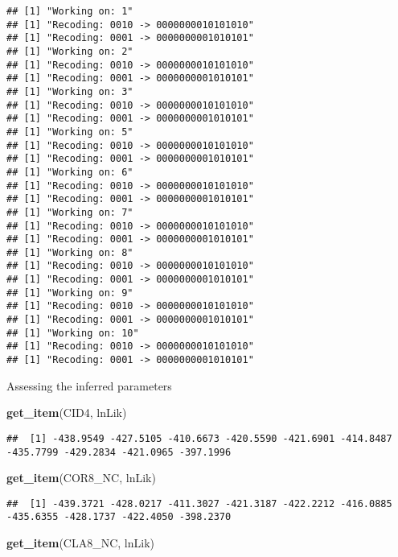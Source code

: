 \documentclass[
]{article}
\newenvironment{Shaded}{\begin{snugshade}}{\end{snugshade}}
\newcommand{\FunctionTok}[1]{\textcolor[rgb]{0.13,0.29,0.53}{\textbf{#1}}}
\newcommand{\NormalTok}[1]{#1}
\newcommand{\StringTok}[1]{\textcolor[rgb]{0.31,0.60,0.02}{#1}}
\begin{document}
\begin{verbatim}
## [1] "Working on: 1"
## [1] "Recoding: 0010 -> 0000000010101010"
## [1] "Recoding: 0001 -> 0000000001010101"
## [1] "Working on: 2"
## [1] "Recoding: 0010 -> 0000000010101010"
## [1] "Recoding: 0001 -> 0000000001010101"
## [1] "Working on: 3"
## [1] "Recoding: 0010 -> 0000000010101010"
## [1] "Recoding: 0001 -> 0000000001010101"
## [1] "Working on: 5"
## [1] "Recoding: 0010 -> 0000000010101010"
## [1] "Recoding: 0001 -> 0000000001010101"
## [1] "Working on: 6"
## [1] "Recoding: 0010 -> 0000000010101010"
## [1] "Recoding: 0001 -> 0000000001010101"
## [1] "Working on: 7"
## [1] "Recoding: 0010 -> 0000000010101010"
## [1] "Recoding: 0001 -> 0000000001010101"
## [1] "Working on: 8"
## [1] "Recoding: 0010 -> 0000000010101010"
## [1] "Recoding: 0001 -> 0000000001010101"
## [1] "Working on: 9"
## [1] "Recoding: 0010 -> 0000000010101010"
## [1] "Recoding: 0001 -> 0000000001010101"
## [1] "Working on: 10"
## [1] "Recoding: 0010 -> 0000000010101010"
## [1] "Recoding: 0001 -> 0000000001010101"
\end{verbatim}

Assessing the inferred parameters

\begin{Shaded}
\begin{Highlighting}[]
\FunctionTok{get\_item}\NormalTok{(CID4, }\StringTok{\textquotesingle{}lnLik\textquotesingle{}}\NormalTok{)}
\end{Highlighting}
\end{Shaded}

\begin{verbatim}
##  [1] -438.9549 -427.5105 -410.6673 -420.5590 -421.6901 -414.8487 -435.7799 -429.2834 -421.0965 -397.1996
\end{verbatim}

\begin{Shaded}
\begin{Highlighting}[]
\FunctionTok{get\_item}\NormalTok{(COR8\_NC, }\StringTok{\textquotesingle{}lnLik\textquotesingle{}}\NormalTok{)}
\end{Highlighting}
\end{Shaded}

\begin{verbatim}
##  [1] -439.3721 -428.0217 -411.3027 -421.3187 -422.2212 -416.0885 -435.6355 -428.1737 -422.4050 -398.2370
\end{verbatim}

\begin{Shaded}
\begin{Highlighting}[]
\FunctionTok{get\_item}\NormalTok{(CLA8\_NC, }\StringTok{\textquotesingle{}lnLik\textquotesingle{}}\NormalTok{)}
\end{Highlighting}
\end{Shaded}
\end{document}
